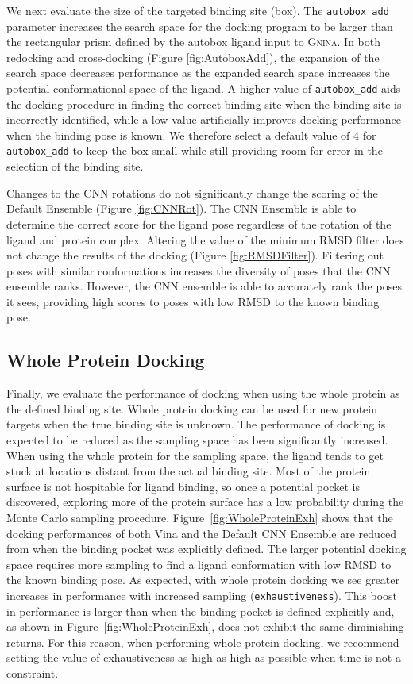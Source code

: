 \documentclass[journal=jcisd8,manuscript=article]{achemso}
\begin{document}
We next evaluate the size of the targeted binding site (box). The \texttt{autobox\_add} parameter increases the search space for the docking program to be larger than the rectangular prism defined by the autobox ligand input to \textsc{Gnina}. In both redocking and cross-docking (Figure \ref{fig:AutoboxAdd}), the expansion of the search space decreases performance as the expanded search space increases the potential conformational space of the ligand. A higher value of \texttt{autobox\_add} aids the docking procedure in finding the correct binding site when the binding site is incorrectly identified, while a low value artificially improves docking performance when the binding pose is known. We therefore select a default value of 4 for \texttt{autobox\_add} to keep the box small while still providing room for error in the selection of the binding site.

Changes to the CNN rotations do not significantly change the scoring of the Default Ensemble (Figure \ref{fig:CNNRot}). The CNN Ensemble is able to determine the correct score for the ligand pose regardless of the rotation of the ligand and protein complex. Altering the value of the minimum RMSD filter does not change the results of the docking (Figure \ref{fig:RMSDFilter}).  Filtering out poses with similar conformations increases the diversity of poses that the CNN ensemble ranks. However, the CNN ensemble is able to accurately rank the poses it sees, providing high scores to poses with low RMSD to the known binding pose.


\subsection{Whole Protein Docking}

Finally, we evaluate the performance of docking when using the whole protein as the defined binding site. Whole protein docking can be used for new protein targets when the true binding site is unknown. The performance of docking is expected to be reduced as the sampling space has been significantly increased. When using the whole protein for the sampling space, the ligand  tends to get stuck at locations distant from the actual binding site. Most of the protein surface is not hospitable for ligand binding, so once a potential pocket is discovered, exploring more of the protein surface has a low probability during the Monte Carlo sampling procedure. Figure~\ref{fig:WholeProteinExh} shows that the docking performances of both Vina and the Default CNN Ensemble are reduced from when the binding pocket was explicitly defined. The larger potential docking space requires more sampling to find a ligand conformation with low RMSD to the known binding pose. As expected, with whole protein docking we see greater increases in performance with increased sampling (\texttt{exhaustiveness}). This boost in performance is larger than when the binding pocket is defined explicitly and, as shown in Figure~\ref{fig:WholeProteinExh}, does not exhibit the same diminishing returns. For this reason, when performing whole protein docking, we recommend setting the value of exhaustiveness as high as high as possible when time is not a constraint.
\end{document}
